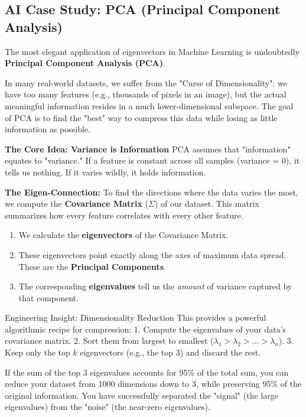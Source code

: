 \documentclass[12pt,a4paper,twoside,openright]{book}
\begin{document}
\subsection{AI Case Study: PCA (Principal Component Analysis)}

The most elegant application of eigenvectors in Machine Learning is undoubtedly \textbf{Principal Component Analysis (PCA)}.

In many real-world datasets, we suffer from the "Curse of Dimensionality": we have too many features (e.g., thousands of pixels in an image), but the actual meaningful information resides in a much lower-dimensional subspace.
The goal of PCA is to find the "best" way to compress this data while losing as little information as possible.

\textbf{The Core Idea: Variance is Information}
PCA assumes that "information" equates to "variance." If a feature is constant across all samples (variance = 0), it tells us nothing. If it varies wildly, it holds information.

\textbf{The Eigen-Connection:}
To find the directions where the data varies the most, we compute the \textbf{Covariance Matrix} ($\Sigma$) of our dataset. This matrix summarizes how every feature correlates with every other feature.
\begin{enumerate}
    \item We calculate the \textbf{eigenvectors} of the Covariance Matrix.
    \item These eigenvectors point exactly along the axes of maximum data spread. These are the \textbf{Principal Components}.
    \item The corresponding \textbf{eigenvalues} tell us the \textit{amount} of variance captured by that component.
\end{enumerate}

\begin{unibobox}{Engineering Insight: Dimensionality Reduction}
This provides a powerful algorithmic recipe for compression:
1. Compute the eigenvalues of your data's covariance matrix.
2. Sort them from largest to smallest ($\lambda_1 > \lambda_2 > \dots > \lambda_n$).
3. Keep only the top $k$ eigenvectors (e.g., the top 3) and discard the rest.

If the sum of the top 3 eigenvalues accounts for 95\% of the total sum, you can reduce your dataset from 1000 dimensions down to 3, while preserving 95\% of the original information. You have successfully separated the "signal" (the large eigenvalues) from the "noise" (the near-zero eigenvalues).
\end{unibobox}
\end{document}
